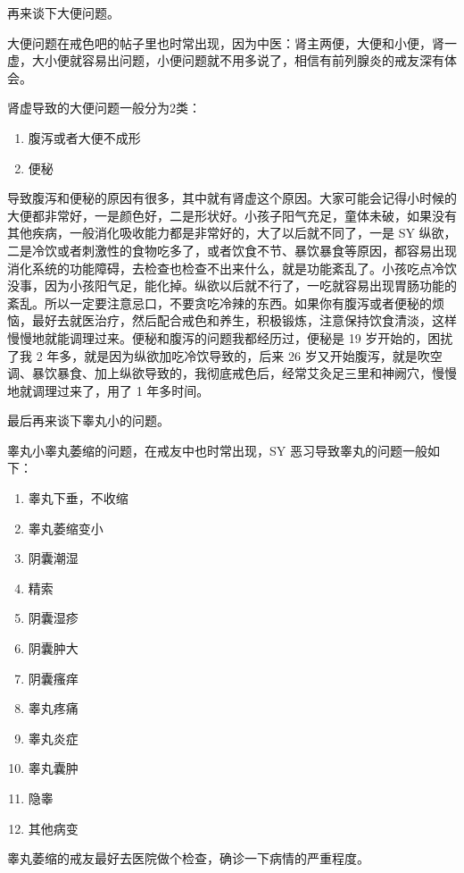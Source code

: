 \documentclass[fontset=founder]{ctexart}
\begin{document}
再来谈下大便问题。

大便问题在戒色吧的帖子里也时常出现，因为中医：肾主两便，大便和小便，肾一虚，大小便就容易出问题，小便问题就不用多说了，相信有前列腺炎的戒友深有体会。

肾虚导致的大便问题一般分为2类：

\begin{enumerate}
    \item 腹泻或者大便不成形
    \item 便秘
\end{enumerate}

导致腹泻和便秘的原因有很多，其中就有肾虚这个原因。大家可能会记得小时候的大便都非常好，一是颜色好，二是形状好。小孩子阳气充足，童体未破，如果没有其他疾病，一般消化吸收能力都是非常好的，大了以后就不同了，一是 SY 纵欲，二是冷饮或者刺激性的食物吃多了，或者饮食不节、暴饮暴食等原因，都容易出现消化系统的功能障碍，去检查也检查不出来什么，就是功能紊乱了。小孩吃点冷饮没事，因为小孩阳气足，能化掉。纵欲以后就不行了，一吃就容易出现胃肠功能的紊乱。所以一定要注意忌口，不要贪吃冷辣的东西。如果你有腹泻或者便秘的烦恼，最好去就医治疗，然后配合戒色和养生，积极锻炼，注意保持饮食清淡，这样慢慢地就能调理过来。便秘和腹泻的问题我都经历过，便秘是 19 岁开始的，困扰了我 2 年多，就是因为纵欲加吃冷饮导致的，后来 26 岁又开始腹泻，就是吹空调、暴饮暴食、加上纵欲导致的，我彻底戒色后，经常艾灸足三里和神阙穴，慢慢地就调理过来了，用了 1 年多时间。

最后再来谈下睾丸小的问题。

睾丸小睾丸萎缩的问题，在戒友中也时常出现，SY 恶习导致睾丸的问题一般如下：

\begin{enumerate}
    \item 睾丸下垂，不收缩
    \item 睾丸萎缩变小
    \item 阴囊潮湿
    \item 精索
    \item 阴囊湿疹
    \item 阴囊肿大
    \item 阴囊瘙痒
    \item 睾丸疼痛
    \item 睾丸炎症
    \item 睾丸囊肿
    \item 隐睾
    \item 其他病变
\end{enumerate}

睾丸萎缩的戒友最好去医院做个检查，确诊一下病情的严重程度。
\end{document}
